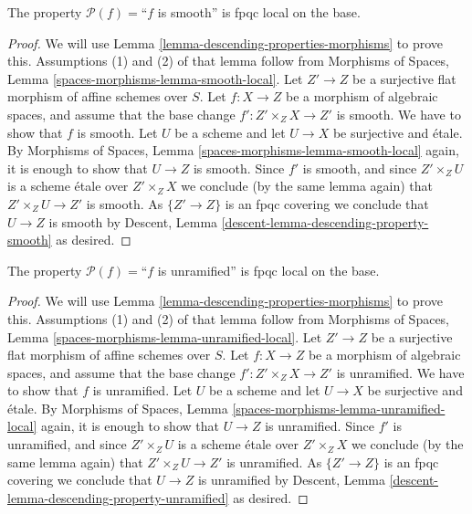 \begin{lemma}
\label{lemma-descending-property-smooth}
The property $\mathcal{P}(f) =$``$f$ is smooth''
is fpqc local on the base.
\end{lemma}

\begin{proof}
We will use
Lemma \ref{lemma-descending-properties-morphisms}
to prove this. Assumptions (1) and (2) of that lemma follow from
Morphisms of Spaces,
Lemma \ref{spaces-morphisms-lemma-smooth-local}.
Let $Z' \to Z$ be a surjective flat morphism of affine schemes over $S$.
Let $f : X \to Z$ be a morphism of algebraic spaces, and assume
that the base change $f' : Z' \times_Z X \to Z'$ is smooth.
We have to show that $f$ is smooth. Let $U$ be a scheme
and let $U \to X$ be surjective and \'etale. By
Morphisms of Spaces,
Lemma \ref{spaces-morphisms-lemma-smooth-local}
again, it is enough to show that $U \to Z$ is smooth.
Since $f'$ is smooth, and since $Z' \times_Z U$ is a
scheme \'etale over $Z' \times_Z X$ we conclude (by the same lemma again) that
$Z' \times_Z U \to Z'$ is smooth.
As $\{Z' \to Z\}$ is an fpqc covering we conclude that
$U \to Z$ is smooth by
Descent, Lemma \ref{descent-lemma-descending-property-smooth}
as desired.
\end{proof}

\begin{lemma}
\label{lemma-descending-property-unramified}
The property $\mathcal{P}(f) =$``$f$ is unramified''
is fpqc local on the base.
\end{lemma}

\begin{proof}
We will use
Lemma \ref{lemma-descending-properties-morphisms}
to prove this. Assumptions (1) and (2) of that lemma follow from
Morphisms of Spaces,
Lemma \ref{spaces-morphisms-lemma-unramified-local}.
Let $Z' \to Z$ be a surjective flat morphism of affine schemes over $S$.
Let $f : X \to Z$ be a morphism of algebraic spaces, and assume
that the base change $f' : Z' \times_Z X \to Z'$ is unramified.
We have to show that $f$ is unramified. Let $U$ be a scheme
and let $U \to X$ be surjective and \'etale. By
Morphisms of Spaces,
Lemma \ref{spaces-morphisms-lemma-unramified-local}
again, it is enough to show that $U \to Z$ is unramified.
Since $f'$ is unramified, and since $Z' \times_Z U$ is a
scheme \'etale over $Z' \times_Z X$ we conclude (by the same lemma again) that
$Z' \times_Z U \to Z'$ is unramified.
As $\{Z' \to Z\}$ is an fpqc covering we conclude that
$U \to Z$ is unramified by
Descent, Lemma \ref{descent-lemma-descending-property-unramified}
as desired.
\end{proof}

